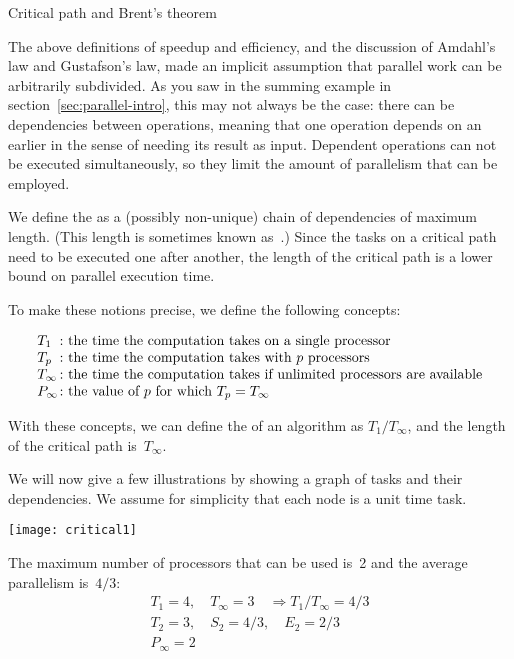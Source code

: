 
 {Critical path and Brent's theorem}
\label{sec:critical-path}

The above definitions of speedup and efficiency,
and the discussion of Amdahl's law and Gustafson's law,
made an implicit assumption
that parallel work can be arbitrarily subdivided.
As you saw in the summing example in section~\ref{sec:parallel-intro},
this may not always be the case: there can be dependencies between
operations,
meaning that one operation depends on an earlier
in the sense of needing its result as input.
Dependent operations can not be executed simultaneously,
so they limit the amount of parallelism that can be employed.

We define the  as a (possibly non-unique)
chain of dependencies
of maximum length.
(This length is sometimes known as~.)
Since the tasks on a critical path need to be
executed one after another, the length of the critical path is a lower
bound on parallel execution time.

To make these notions precise, we define the following concepts:
\begin{definition}
  \[ 
  \begin{array}{l@{\colon}l}
    T_1&\hbox{the time the computation takes on a single processor}\\
    T_p&\hbox{the time the computation takes with $p$ processors}\\
    T_\infty&\hbox{the time the computation takes if unlimited processors are available}\\
    P_\infty&\hbox{the value of $p$ for which $T_p=T_\infty$}
  \end{array}  
  \]
\end{definition}
With these concepts, we can define the 
of an algorithm as $T_1/T_\infty$, and the length of the critical path is~$T_\infty$.

We will now give a few illustrations by showing a graph of tasks and their dependencies.
We assume for simplicity that each node is a unit time task.

\begin{minipage}{\textwidth}
  \begin{minipage}{.25\textwidth}
    \texttt{[image: critical1]}
  \end{minipage}
  \begin{minipage}{.75\textwidth}
    The maximum number of processors that can be used is~2 and the
    average parallelism is~$4/3$:
    \[
    \begin{array}{l}
      T_1=4,\quad T_\infty=3 \quad\Rightarrow T_1/T_\infty=4/3\\
      T_2=3,\quad S_2=4/3,\quad E_2=2/3\\
      P_\infty=2
    \end{array}
    \]
  \end{minipage}
\end{minipage}

